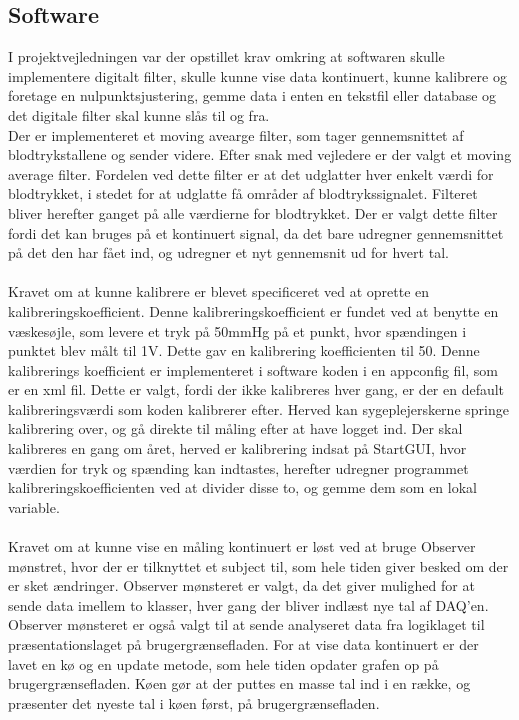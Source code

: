 \subsection{Software}
I projektvejledningen var der opstillet krav omkring at softwaren skulle implementere digitalt filter, skulle kunne vise data kontinuert, kunne kalibrere og foretage en nulpunktsjustering, gemme data i enten en tekstfil eller database og det digitale filter skal kunne slås til og fra. \\
Der er implementeret et moving avearge filter, som tager gennemsnittet af blodtrykstallene og sender videre. Efter snak med vejledere er der valgt et moving average filter. Fordelen ved dette filter er at det udglatter hver enkelt værdi for blodtrykket, i stedet for at udglatte få områder af blodtrykssignalet. Filteret bliver herefter ganget på alle værdierne for blodtrykket. Der er valgt dette filter fordi det kan bruges på et kontinuert signal, da det bare udregner gennemsnittet på det den har fået ind, og udregner et nyt gennemsnit ud for hvert tal. \\\\
Kravet om at kunne kalibrere er blevet specificeret ved at oprette en kalibreringskoefficient. Denne kalibreringskoefficient er fundet ved at benytte en væskesøjle, som levere et tryk på 50mmHg på et punkt, hvor spændingen i punktet blev målt til 1V. Dette gav en kalibrering koefficienten til 50. Denne kalibrerings koefficient er implementeret i software koden i en appconfig fil, som er en xml fil. Dette er valgt, fordi der ikke kalibreres hver gang, er der en default kalibreringsværdi som koden kalibrerer efter. Herved kan sygeplejerskerne springe kalibrering over, og gå direkte til måling efter at have logget ind. Der skal kalibreres en gang om året, herved er kalibrering indsat på StartGUI, hvor værdien for tryk og spænding kan indtastes, herefter udregner programmet kalibreringskoefficienten ved at divider disse to, og gemme dem som en lokal variable. \\\\
Kravet om at kunne vise en måling kontinuert er løst ved at bruge Observer mønstret, hvor der er tilknyttet et subject til, som hele tiden giver besked om der er sket ændringer.  Observer mønsteret er valgt, da det giver mulighed for at sende data imellem to klasser, hver gang der bliver indlæst nye tal af DAQ’en. Observer mønsteret er også valgt til at sende analyseret data fra logiklaget til præsentationslaget på brugergrænsefladen. For at vise data kontinuert er der lavet en kø og en update metode, som hele tiden opdater grafen op på brugergrænsefladen. Køen gør at der puttes en masse tal ind i en række, og præsenter det nyeste tal i køen først, på brugergrænsefladen. \\\\
